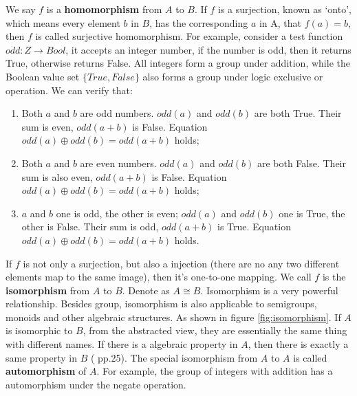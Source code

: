 \documentclass[b5paper]{article}
\begin{document}
We say $f$ is a \textbf{homomorphism} from $A$ to $B$. If $f$ is a surjection, known as `onto', which means every element $b$ in $B$, has the corresponding $a$ in A, that $f(a) = b$, then $f$ is called surjective homomorphism. For example, consider a test function $odd: Z \to Bool$, it accepts an integer number, if the number is odd, then it returns True, otherwise returns False. All integers form a group under addition, while the Boolean value set $\{True, False\}$ also forms a group under logic exclusive or operation. We can verify that:

\begin{enumerate}
\item Both $a$ and $b$ are odd numbers. $odd(a)$ and $odd(b)$ are both True. Their sum is even, $odd(a+b)$ is False. Equation $odd(a) \oplus odd(b) = odd(a+b)$ holds;
\item Both $a$ and $b$ are even numbers. $odd(a)$ and $odd(b)$ are both False. Their sum is also even, $odd(a+b)$ is False. Equation $odd(a) \oplus odd(b) = odd(a+b)$ holds;
\item $a$ and $b$ one is odd, the other is even; $odd(a)$ and $odd(b)$ one is True, the other is False. Their sum is odd, $odd(a+b)$ is True. Equation $odd(a) \oplus odd(b) = odd(a+b)$ holds.
\end{enumerate}

If $f$ is not only a surjection, but also a injection (there are no any two different elements map to the same image), then it's one-to-one mapping. We call $f$ is the \textbf{isomorphism} from $A$ to $B$. Denote as $A \cong B$. Isomorphism is a very powerful relationship. Besides group, isomorphism is also applicable to semigroups, monoids and other algebraic structures. As shown in figure \ref{fig:isomorphism}. If $A$ is isomorphic to $B$, from the abstracted view, they are essentially the same thing with different names. If there is a algebraic property in $A$, then there is exactly a same property in $B$ (\cite{ZhangHeRui1978} pp.25). The special isomorphism from $A$ to $A$ is called \textbf{automorphism} of $A$. For example, the group of integers with addition has a automorphism under the negate operation.
\end{document}
